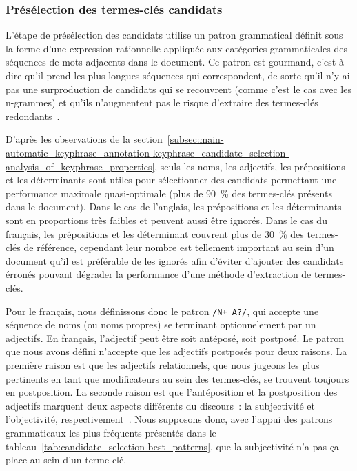       \subsubsection{Présélection des termes-clés candidats}
      \label{subsubsec:main-automatic_keyphrase_annotation-keyphrase_candidate_selection-modifiers_filtering-candidate_pre_selection}
        L'étape de présélection des candidats utilise un patron grammatical
        définit sous la forme d'une expression rationnelle appliquée aux
        catégories grammaticales des séquences de mots adjacents dans le
        document. Ce patron est gourmand, c'est-à-dire qu'il prend les plus
        longues séquences qui correspondent, de sorte qu'il n'y ai pas une
        surproduction de candidats qui se recouvrent (comme c'est le cas avec
        les n-grammes) et qu'ils n'augmentent pas le risque d'extraire des
        termes-clés redondants~\cite{hasan2014state_of_the_art}.

        D'après les observations de la
        section~\ref{subsec:main-automatic_keyphrase_annotation-keyphrase_candidate_selection-analysis_of_keyphrase_properties},
        seuls les noms, les adjectifs, les prépositions et les déterminants
        sont utiles pour sélectionner des candidats permettant une performance
        maximale quasi-optimale (plus de 90~\% des termes-clés présents dans le
        document). Dans le cas de l'anglais, les prépositions et les
        déterminants sont en proportions très faibles et peuvent aussi être
        ignorés. Dans le cas du français, les prépositions et les déterminant
        couvrent plus de 30~\% des termes-clés de référence, cependant leur
        nombre est tellement important au sein d'un document qu'il est
        préférable de les ignorés afin d'éviter d'ajouter des candidats érronés
        pouvant dégrader la performance d'une méthode d'extraction de
        termes-clés.
        
        Pour le français, nous définissons donc le patron \texttt{/N+ A?/}, qui
        accepte une séquence de noms (ou noms propres) se terminant
        optionnelement par un adjectifs. En français, l'adjectif peut
        être soit antéposé, soit postposé. Le patron que nous avons défini
        n'accepte que les adjectifs postposés pour deux raisons. La première
        raison est que les adjectifs relationnels, que nous jugeons les plus
        pertinents en tant que modificateurs au sein des termes-clés, se
        trouvent toujours en postposition. La seconde raison est que
        l'antéposition et la postposition des adjectifs marquent deux aspects
        différents du discours~: la subjectivité et l'objectivité,
        respectivement~\cite{eskenazi2005adjectifavantapres}. Nous supposons
        donc, avec l'appui des patrons grammaticaux les plus fréquents présentés
        dans le tableau~\ref{tab:candidate_selection-best_patterns}, que la
        subjectivité n'a pas ça place au sein d'un terme-clé.
        
